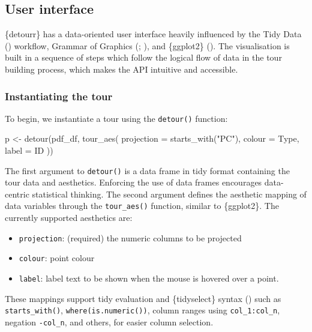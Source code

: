 \hypertarget{user-interface}{%
\subsection{User interface}\label{user-interface}}

\{detourr\} has a data-oriented user interface heavily influenced by the
Tidy Data (\citet{tidydata}) workflow, Grammar of Graphics
(\citet{wilkinson2012grammar}; \citet{wickham2010layered}), and
\{ggplot2\} (\citet{wickham2016ggplot2}). The visualisation is built in
a sequence of steps which follow the logical flow of data in the tour
building process, which makes the API intuitive and accessible.

\hypertarget{instantiating-the-tour}{%
\subsubsection{Instantiating the tour}\label{instantiating-the-tour}}

To begin, we instantiate a tour using the \texttt{detour()} function:

\begin{Schunk}
\begin{Sinput}
p <- detour(pdf_df, tour_aes(
    projection = starts_with("PC"),
    colour = Type,
    label = ID
))
\end{Sinput}
\end{Schunk}

The first argument to \texttt{detour()} is a data frame in tidy format
containing the tour data and aesthetics. Enforcing the use of data
frames encourages data-centric statistical thinking. The second argument
defines the aesthetic mapping of data variables through the
\texttt{tour\_aes()} function, similar to \{ggplot2\}. The currently
supported aesthetics are:

\begin{itemize}
\tightlist
\item
  \texttt{projection}: (required) the numeric columns to be projected
\item
  \texttt{colour}: point colour
\item
  \texttt{label}: label text to be shown when the mouse is hovered over
  a point.
\end{itemize}

These mappings support tidy evaluation and \{tidyselect\} syntax
(\citet{tidyselect}) such as \texttt{starts\_with()},
\texttt{where(is.numeric())}, column ranges using
\texttt{col\_1:col\_n}, negation \texttt{-col\_n}, and others, for
easier column selection.

